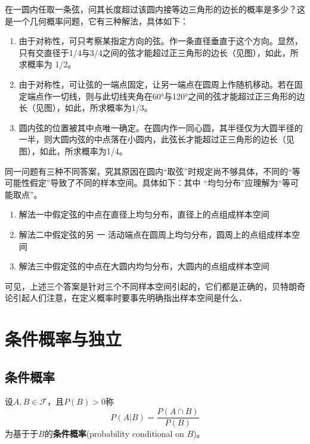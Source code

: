 在一圆内任取一条弦，问其长度超过该圆内接等边三角形的边长的概率是多少？这是一个几何概率问题，它有三种解法，具体如下：
\begin{enumerate}
    \item 由于对称性，可只考察某指定方向的弦。作一条直径垂直于这个方向。显然，只有交直径于1/4与3/4之间的弦才能超过正三角形的边长（见图），如此，所求概率为 1/2。
    \item 由于对称性，可让弦的一端点固定，让另一端点在圆周上作随机移动。若在固定端点作一切线，则与此切线夹角在60°与120°之间的弦才能超过正三角形的边长（见图），如此，所求概率为1/3。
    \item 圆内弦的位置被其中点唯一确定。在圆内作一同心圆，其半径仅为大圆半径的一半，则大圆内弦的中点落在小圆内，此弦长才能超过正三角形的边长（见图），如此，所求概率为1/4。
\end{enumerate}

同一问题有三种不同答案，究其原因在圆内“取弦”时规定尚不够具体，不同的“等可能性假定”导致了不同的样本空间。具体如下：其中
“均匀分布”应理解为“等可能取点”。
\begin{enumerate}
    \item 解法一中假定弦的中点在直径上均匀分布，直径上的点组成样本空间
    \item 解法二中假定弦的另 一 活动端点在圆周上均匀分布，圆周上的点组成样本空间
    \item 解法三中假定弦的中点在大圆内均匀分布，大圆内的点组成样本空间
\end{enumerate}

可见，上述三个答案是针对三个不同样本空间引起的，它们都是正确的，贝特朗奇论引起人们注意，在定义概率时要事先明确指出样本空间是什么．

\section{条件概率与独立}

\subsection{条件概率}

\begin{definition}[条件概率]
    设$A,B \in \mathscr{F}$，且$P(B)>0$称
    \[ P(A|B) = \frac{P(A \cap B)}{P(B)}\]
    为基于于$B$的\textbf{条件概率}(probability conditional on $B$)。
\end{definition}

